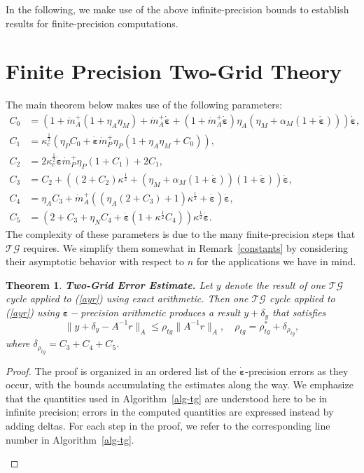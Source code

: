 \documentclass[onefignum,onetabnum]{siamart220329}
\newtheorem{thm}{Theorem}
\newcommand{\ewed}{\boldsymbol{\dot{\varepsilon}}}
\newcommand{\aladot}{{\dot{m}}_A^+}
\newcommand{\alpdot}{{\dot{m}}_P^+}
\newcommand{\tg}{$\mathcal{TG}$}
\begin{document}
{In the following, we make use of the above infinite-precision bounds to establish results for finite-precision computations.

\section{Finite Precision Two-Grid Theory}
\label{analysis}

The main theorem below makes use of the following parameters:
\begin{align*}
C_0 &=  (1 + \aladot (1 + \eta_A \eta_M) + \aladot \ewed + (1 + \aladot \ewed) \eta_A (\eta_M + \alpha_M  (1 + \ewed))) \ewed ,\\
C_1 &=  \kappa_c^\frac{1}{2} (\eta_P C_0 + \ewed \alpdot \eta_P (1 + \eta_A \eta_M + C_0)) ,\\
C_2 &= 2 \kappa_c^\frac{1}{2} \ewed \alpdot \eta_P (1 + C_1) + 2 C_1 , \\
C_3 &= C_2 + ((2 + C_2)\kappa^\frac{1}{2}  + (\eta_M + \alpha_M  (1 + \ewed))(1 + \ewed)) \ewed ,\\
C_4 &= \eta_A C_3 + \aladot ((\eta_A (2 + C_3) + 1) \kappa^\frac{1}{2} + \ewed) \ewed , \\
C_5 &= (2 + C_3 + \eta_N C_4 + \ewed (1 + \kappa^\frac{1}{2} C_4)) \kappa^\frac{1}{2} \ewed .
\end{align*} 
The complexity of these parameters is due to the many finite-precision steps that {\tg } requires. We simplify them somewhat in Remark~\ref{constants} by considering their asymptotic behavior with respect to $n$  for the applications we have in mind.

\begin{thm}{\bf Two-Grid Error Estimate.} Let $y$ denote the result of one{ \tg } cycle applied to (\ref{ayr}) using exact arithmetic. Then one{ \tg } cycle applied to (\ref{ayr}) using $\ewed-$precision arithmetic produces a result $y + \delta_y$ that satisfies
\begin{equation}
\|y+ \delta_y - A^{-1}r\|_A \le \rho_{tg} \|A^{-1}r\|_A, \quad \rho_{tg} = \rho_{tg}^* + \delta_{\rho_{tg}} ,
\label{conv}
\end{equation}
where $\delta_{\rho_{tg}} = C_3 + C_4 + C_5$.
\label{thm:tg}
\end{thm}

\begin{proof}
The proof is organized in an ordered list of the $\ewed$-precision errors as they occur, with the bounds accumulating the estimates along the way. We emphasize that the quantities used in Algorithm~\ref{alg-tg} are understood here to be in infinite precision; errors in the computed quantities are expressed instead by adding deltas. For each step in the proof, we refer to the corresponding line number in Algorithm~\ref{alg-tg}.
\begin{itemize}


\end{itemize}
\end{proof}}
\end{document}
